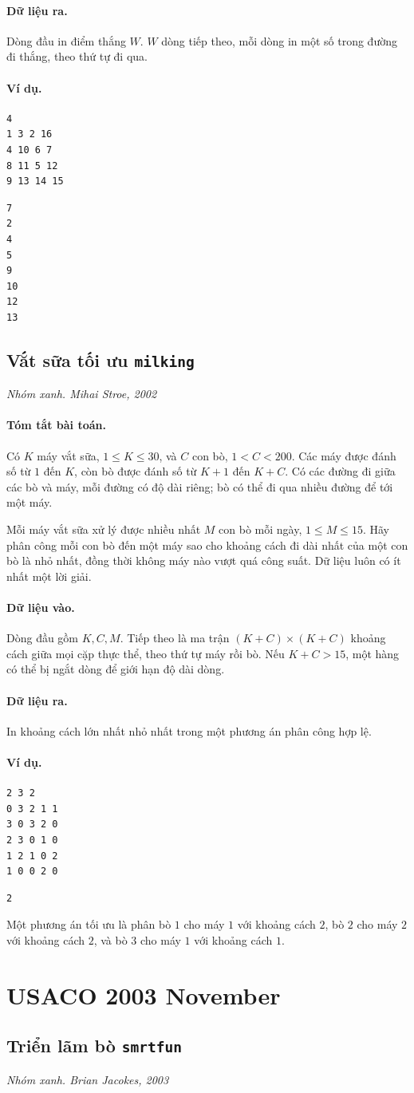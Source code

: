 \documentclass[11pt]{article}
\newcommand{\problem}[4]{%
  \subsection[#1 (#2)]{#1 \hfill {\normalsize\texttt{#2}}}%
  \noindent\textit{#3. #4}\par\smallskip
}
\newcommand{\iosec}[1]{\paragraph{#1}}
\begin{document}
\iosec{Dữ liệu ra.}
Dòng đầu in điểm thắng \(W\). \(W\) dòng tiếp theo, mỗi dòng in một số trong
đường đi thắng, theo thứ tự đi qua.

\iosec{Ví dụ.}
\begin{verbatim}
4
1 3 2 16
4 10 6 7
8 11 5 12
9 13 14 15
\end{verbatim}

\begin{verbatim}
7
2
4
5
9
10
12
13
\end{verbatim}

\problem{Vắt sữa tối ưu}{milking}{Nhóm xanh}{Mihai Stroe, 2002}

\iosec{Tóm tắt bài toán.}
Có \(K\) máy vắt sữa, \(1\le K\le 30\), và \(C\) con bò,
\(1<C<200\). Các máy được đánh số từ \(1\) đến \(K\), còn bò được đánh số từ
\(K+1\) đến \(K+C\). Có các đường đi giữa các bò và máy, mỗi đường có độ dài
riêng; bò có thể đi qua nhiều đường để tới một máy.

Mỗi máy vắt sữa xử lý được nhiều nhất \(M\) con bò mỗi ngày,
\(1\le M\le 15\). Hãy phân công mỗi con bò đến một máy sao cho khoảng cách đi
dài nhất của một con bò là nhỏ nhất, đồng thời không máy nào vượt quá công
suất. Dữ liệu luôn có ít nhất một lời giải.

\iosec{Dữ liệu vào.}
Dòng đầu gồm \(K,C,M\). Tiếp theo là ma trận \((K+C)\times(K+C)\) khoảng cách
giữa mọi cặp thực thể, theo thứ tự máy rồi bò. Nếu \(K+C>15\), một hàng có thể
bị ngắt dòng để giới hạn độ dài dòng.

\iosec{Dữ liệu ra.}
In khoảng cách lớn nhất nhỏ nhất trong một phương án phân công hợp lệ.

\iosec{Ví dụ.}
\begin{verbatim}
2 3 2
0 3 2 1 1
3 0 3 2 0
2 3 0 1 0
1 2 1 0 2
1 0 0 2 0
\end{verbatim}

\begin{verbatim}
2
\end{verbatim}

Một phương án tối ưu là phân bò \(1\) cho máy \(1\) với khoảng cách \(2\), bò
\(2\) cho máy \(2\) với khoảng cách \(2\), và bò \(3\) cho máy \(1\) với
khoảng cách \(1\).

\section{USACO 2003 November}

\problem{Triển lãm bò}{smrtfun}{Nhóm xanh}{Brian Jacokes, 2003}
\end{document}

